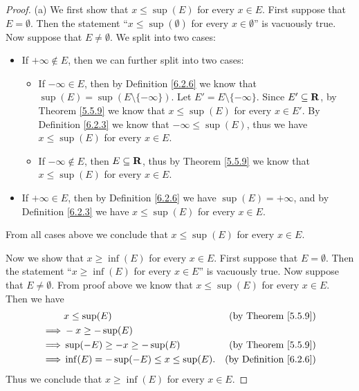 \begin{proof}{(a)}
    We first show that \(x \leq \sup(E)\) for every \(x \in E\).
    First suppose that \(E = \emptyset\).
    Then the statement ``\(x \leq \sup(\emptyset)\) for every \(x \in \emptyset\)'' is vacuously true.
    Now suppose that \(E \neq \emptyset\).
    We split into two cases:
    \begin{itemize}
        \item If \(+\infty \not\in E\), then we can further split into two cases:
              \begin{itemize}
                  \item If \(-\infty \in E\), then by Definition \ref{6.2.6} we know that \(\sup(E) = \sup(E \setminus \{-\infty\})\).
                        Let \(E' = E \setminus \{-\infty\}\).
                        Since \(E' \subseteq \mathbf{R}\), by Theorem \ref{5.5.9} we know that \(x \leq \sup(E)\) for every \(x \in E'\).
                        By Definition \ref{6.2.3} we know that \(-\infty \leq \sup(E)\), thus we have \(x \leq \sup(E)\) for every \(x \in E\).
                  \item If \(-\infty \notin E\), then \(E \subseteq \mathbf{R}\), thus by Theorem \ref{5.5.9} we know that \(x \leq \sup(E)\) for every \(x \in E\).
              \end{itemize}
        \item If \(+\infty \in E\), then by Definition \ref{6.2.6} we have \(\sup(E) = +\infty\), and by Definition \ref{6.2.3} we have \(x \leq \sup(E)\) for every \(x \in E\).
    \end{itemize}
    From all cases above we conclude that \(x \leq \sup(E)\) for every \(x \in E\).

    Now we show that \(x \geq \inf(E)\) for every \(x \in E\).
    First suppose that \(E = \emptyset\).
    Then the statement ``\(x \geq \inf(E)\) for every \(x \in E\)'' is vacuously true.
    Now suppose that \(E \neq \emptyset\).
    From proof above we know that \(x \leq \sup(E)\) for every \(x \in E\).
    Then we have
    \begin{align*}
                 & x \leq \sup(E)                           & \text{(by Theorem \ref{5.5.9})}    \\
        \implies & -x \geq -\sup(E)                                                              \\
        \implies & \sup(-E) \geq -x \geq -\sup(E)           & \text{(by Theorem \ref{5.5.9})}    \\
        \implies & \inf(E) = -\sup(-E) \leq x \leq \sup(E). & \text{(by Definition \ref{6.2.6})}
    \end{align*}
    Thus we conclude that \(x \geq \inf(E)\) for every \(x \in E\).
\end{proof}

